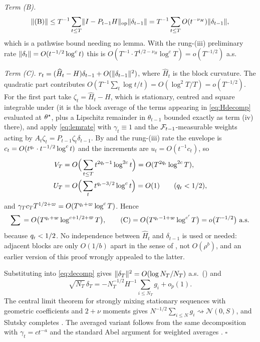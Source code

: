 \emph{Term (B).}
\[
\lVert (\mathrm B) \rVert\le T^{-1}\sum_{t\le T}\lVert I-P_{t-1}H \rVert_{\mathrm{op}}\lVert \delta_{t-1} \rVert
=T^{-1}\sum_{t\le T}O(t^{-\nu_H})\lVert \delta_{t-1} \rVert,
\]
which is a pathwise bound needing no lemma. With the rung-(iii) preliminary rate $\lVert \delta_t \rVert=O(t^{-1/2}\log^{c}t)$ this is
$O(T^{-1}\cdot T^{1/2-\nu_H}\log^{c}T)=o(T^{-1/2})$ a.s.

\emph{Term (C).} $r_t=(\widehat H_t-H)\delta_{t-1}+O(\lVert \delta_{t-1} \rVert^2)$, where
$\widehat H_t$ is the block curvature. The quadratic part contributes
$O(T^{-1}\sum_t\log t/t)=O(\log^2T/T)=o(T^{-1/2})$. For the first part take
$\zeta_t=\widehat H_t-H$, which is stationary, centred and square integrable under
 (it is the block average of the terms appearing in \eqref{eq:Hdecomp}
evaluated at $\theta^\star$, plus a Lipschitz remainder in $\theta_{t-1}$ bounded exactly as term
(iv) there), and apply \eqref{eq:lemrate} with $\gamma_t\equiv1$ and the
$\mathcal{F}_{t-1}$-measurable weights acting by $A_t\zeta_t=P_{t-1}\zeta_t\delta_{t-1}$. By
 and the rung-(iii) rate the envelope is
$c_t=O(t^{q_{\mathrm r}}\cdot t^{-1/2}\log^{c}t)$ and the increments are $u_t=O(t^{-1}c_t)$, so
\begin{align*}
V_T&=O\Big(\sum_{t\le T}t^{2q_{\mathrm r}-1}\log^{2c}t\Big)=O(T^{2q_{\mathrm r}}\log^{2c}T),\\
U_T&=O\Big(\sum_t t^{q_{\mathrm r}-3/2}\log^{c}t\Big)=O(1)\qquad(q_{\mathrm r}<1/2),
\end{align*}
and $\gamma_Tc_TT^{1/2+\varpi}=O(T^{q_{\mathrm r}+\varpi}\log^{c}T)$. Hence
\[
\sum{}=O\big(T^{\qr+\varpi}\log^{c+1/2+\varpi}T\big),
\qquad
(\mathrm C)=O\big(T^{\qr-1+\varpi}\log^{c'}T\big)=o\big(T^{-1/2}\big)\ \text{a.s.}
\]
because $q_{\mathrm r}<1/2$.
No independence between $\widehat H_t$ and $\delta_{t-1}$ is used or needed: adjacent blocks
are only $O(1/b)$ apart in the sense of , not $O(\rho^b)$, and an earlier
version of this proof wrongly appealed to the latter.

Substituting into \eqref{eq:decomp} gives $\lVert \delta_T \rVert^2=O(\log N_T/N_T)$ a.s.\
() and
\[
\sqrt{N_T}\,\delta_T=-N_T^{-1/2}H^{-1}\sum_{i\le N_T}g_i+o_p(1).
\]
The central limit theorem
for strongly mixing stationary sequences with geometric coefficients and $2+\nu$ moments
\citep{ibragimov1962some,herrndorf1984functional} gives
$N^{-1/2}\sum_{i\le N}g_i\rightsquigarrow\mathcal N(0,S)$, and Slutsky completes
\Cref{thm:clt}. The averaged variant follows from the same decomposition with
$\gamma_t=c t^{-a}$ and the standard Abel argument for weighted averages
\citep{mokkadem2011generalization,pelletier2000asymptotic}. \hfill$\square$

